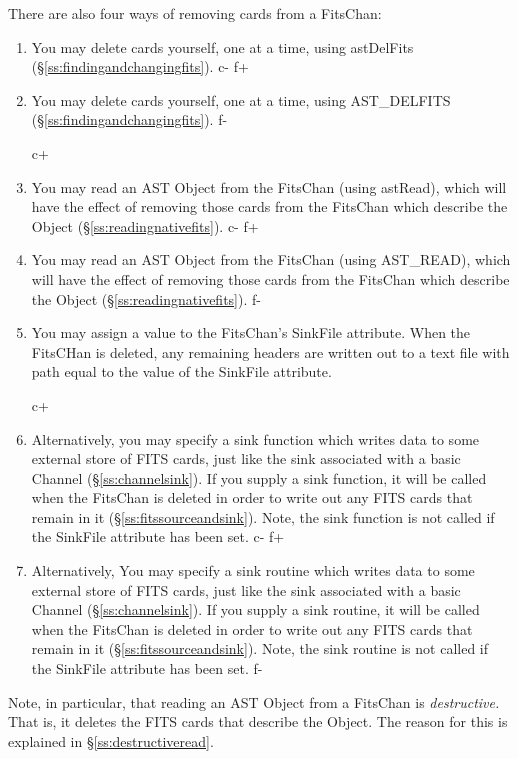 \documentclass[twoside,11pt]{article}
\newcommand{\secref}[1]{\S\ref{#1}}
\newcommand{\secref}[1]{\ref{#1}}
\begin{document}
There are also four ways of removing cards from a FitsChan:

\begin{enumerate}
c+
\item You may delete cards yourself, one at a time, using astDelFits
(\secref{ss:findingandchangingfits}).
c-
f+
\item You may delete cards yourself, one at a time, using AST\_DELFITS
(\secref{ss:findingandchangingfits}).
f-

c+
\item You may read an AST Object from the FitsChan (using astRead),
which will have the effect of removing those cards from the FitsChan
which describe the Object (\secref{ss:readingnativefits}).
c-
f+
\item You may read an AST Object from the FitsChan (using AST\_READ),
which will have the effect of removing those cards from the FitsChan
which describe the Object (\secref{ss:readingnativefits}).
f-

\item You may assign a value to the FitsChan's SinkFile attribute. When
the FitsCHan is deleted, any remaining headers are written out to a text
file with path equal to the value of the SinkFile attribute.

c+
\item Alternatively, you may specify a sink function which writes data to some
external store of FITS cards, just like the sink associated with a
basic Channel (\secref{ss:channelsink}). If you supply a sink function,
it will be called when the FitsChan is deleted in order to write out
any FITS cards that remain in it (\secref{ss:fitssourceandsink}). Note,
the sink function is not called if the SinkFile attribute has been set.
c-
f+
\item Alternatively, You may specify a sink routine which writes data to some
external store of FITS cards, just like the sink associated with a
basic Channel (\secref{ss:channelsink}). If you supply a sink routine,
it will be called when the FitsChan is deleted in order to write out
any FITS cards that remain in it (\secref{ss:fitssourceandsink}). Note,
the sink routine is not called if the SinkFile attribute has been set.
f-
\end{enumerate}

Note, in particular, that reading an AST Object from a FitsChan is
{\em{destructive.}} That is, it deletes the FITS cards that describe the
Object. The reason for this is explained in
\secref{ss:destructiveread}.
\end{document}
